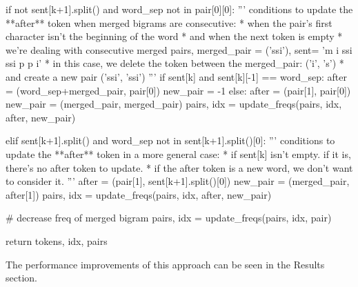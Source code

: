 \begin{python}
      if not sent[k+1].split() and word_sep not in pair[0][0]:
        '''
        conditions to update the **after** token when merged bigrams are consecutive:
        * when the pair's first character isn't the beginning of the word
        * and when the next token is empty
        * we're dealing with consecutive merged pairs, merged_pair = ('ssi'), sent= 'm i ssi ssi p p i'
            * in this case, we delete the token between the merged_pair: ('i', 's')
            * and create a new pair ('ssi', 'ssi')
        '''
        if sent[k] and sent[k][-1] == word_sep:
            after = (word_sep+merged_pair, pair[0])
            new_pair = -1
        else:
            after = (pair[1], pair[0])
            new_pair = (merged_pair, merged_pair)
            pairs, idx = update_freqs(pairs, idx, after, new_pair)

      elif sent[k+1].split() and word_sep not in sent[k+1].split()[0]:
        '''
        conditions to update the **after** token in a more general case:
        * if sent[k] isn't empty. if it is, there's no after token to update.
        * if the after token is a new word, we don't want to consider it.
        '''
        after = (pair[1], sent[k+1].split()[0])
        new_pair = (merged_pair, after[1])
        pairs, idx = update_freqs(pairs, idx, after, new_pair)

      # decrease freq of merged bigram
      pairs, idx = update_freqs(pairs, idx, pair)

  return tokens, idx, pairs
\end{python}

The performance improvements of this approach can be seen in the Results section.

\begin{python}

\end{python}
